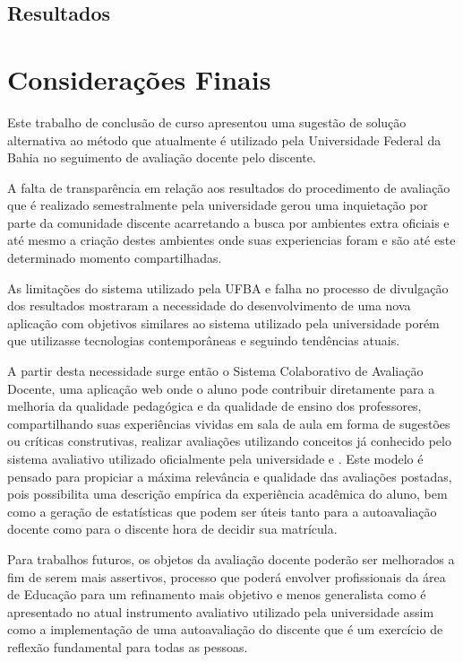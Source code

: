 \documentclass[12pt, a4paper]{report}
\begin{document}
\section{Resultados} 


\chapter{Considerações Finais}

Este trabalho de conclusão de curso apresentou uma sugestão de solução alternativa ao método que atualmente é utilizado pela Universidade Federal da Bahia no seguimento de avaliação docente pelo discente.

A falta de transparência em relação aos resultados do procedimento de avaliação que é realizado semestralmente pela universidade gerou uma inquietação por parte da comunidade discente acarretando a busca por ambientes extra oficiais e até mesmo a criação destes ambientes onde suas experiencias foram e são até este determinado momento compartilhadas.

As limitações do sistema utilizado pela UFBA e falha no processo de divulgação dos resultados mostraram a necessidade do desenvolvimento de uma nova aplicação com objetivos similares ao sistema utilizado pela universidade porém que  utilizasse tecnologias contemporâneas e seguindo tendências atuais. 

A partir desta necessidade surge então o Sistema Colaborativo de Avaliação Docente, uma aplicação web onde o aluno pode contribuir diretamente para a melhoria  da qualidade pedagógica e da qualidade de ensino dos professores, compartilhando suas experiências vividas em sala de aula em forma de sugestões ou críticas construtivas, realizar avaliações utilizando conceitos
já conhecido pelo sistema avaliativo utilizado oficialmente pela universidade e . Este modelo é pensado para propiciar a máxima relevância e qualidade das avaliações postadas, pois possibilita uma descrição empírica da experiência acadêmica do aluno, bem como a geração de estatísticas que podem ser úteis tanto para a autoavaliação docente como para o discente  hora de decidir sua matrícula.

Para trabalhos futuros, os objetos da avaliação docente poderão ser melhorados a fim de serem mais assertivos, processo que poderá envolver profissionais da área de Educação para um refinamento mais objetivo e menos generalista como é apresentado no atual instrumento avaliativo utilizado pela universidade assim como a implementação de uma autoavaliação do discente que é um exercício de reflexão fundamental para todas as pessoas. 
\end{document}
